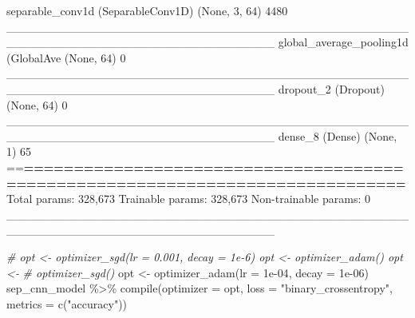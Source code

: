\documentclass[
]{article}
\newenvironment{Shaded}{}{}
\newcommand{\AttributeTok}[1]{\textcolor[rgb]{0.49,0.56,0.16}{#1}}
\newcommand{\CommentTok}[1]{\textcolor[rgb]{0.38,0.63,0.69}{\textit{#1}}}
\newcommand{\DecValTok}[1]{\textcolor[rgb]{0.25,0.63,0.44}{#1}}
\newcommand{\ErrorTok}[1]{\textcolor[rgb]{1.00,0.00,0.00}{\textbf{#1}}}
\newcommand{\FloatTok}[1]{\textcolor[rgb]{0.25,0.63,0.44}{#1}}
\newcommand{\FunctionTok}[1]{\textcolor[rgb]{0.02,0.16,0.49}{#1}}
\newcommand{\NormalTok}[1]{#1}
\newcommand{\OtherTok}[1]{\textcolor[rgb]{0.00,0.44,0.13}{#1}}
\newcommand{\SpecialCharTok}[1]{\textcolor[rgb]{0.25,0.44,0.63}{#1}}
\newcommand{\StringTok}[1]{\textcolor[rgb]{0.25,0.44,0.63}{#1}}
\begin{document}
\begin{Shaded}
\begin{Highlighting}[]
\FunctionTok{separable\_conv1d}\NormalTok{ (SeparableConv1D)  (None, }\DecValTok{3}\NormalTok{, }\DecValTok{64}\NormalTok{)                   }\DecValTok{4480}        
\NormalTok{\_\_\_\_\_\_\_\_\_\_\_\_\_\_\_\_\_\_\_\_\_\_\_\_\_\_\_\_\_\_\_\_\_\_\_\_\_\_\_\_\_\_\_\_\_\_\_\_\_\_\_\_\_\_\_\_\_\_\_\_\_\_\_\_\_\_\_\_\_\_\_\_\_\_\_\_\_\_\_\_}
\FunctionTok{global\_average\_pooling1d}\NormalTok{ (}\FunctionTok{GlobalAve}\NormalTok{ (None, }\DecValTok{64}\NormalTok{)                      }\DecValTok{0}           
\NormalTok{\_\_\_\_\_\_\_\_\_\_\_\_\_\_\_\_\_\_\_\_\_\_\_\_\_\_\_\_\_\_\_\_\_\_\_\_\_\_\_\_\_\_\_\_\_\_\_\_\_\_\_\_\_\_\_\_\_\_\_\_\_\_\_\_\_\_\_\_\_\_\_\_\_\_\_\_\_\_\_\_}
\FunctionTok{dropout\_2}\NormalTok{ (Dropout)                 (None, }\DecValTok{64}\NormalTok{)                      }\DecValTok{0}           
\NormalTok{\_\_\_\_\_\_\_\_\_\_\_\_\_\_\_\_\_\_\_\_\_\_\_\_\_\_\_\_\_\_\_\_\_\_\_\_\_\_\_\_\_\_\_\_\_\_\_\_\_\_\_\_\_\_\_\_\_\_\_\_\_\_\_\_\_\_\_\_\_\_\_\_\_\_\_\_\_\_\_\_}
\FunctionTok{dense\_8}\NormalTok{ (Dense)                     (None, }\DecValTok{1}\NormalTok{)                       }\DecValTok{65}          
\SpecialCharTok{==}\ErrorTok{==============================================================================}
\NormalTok{Total params}\SpecialCharTok{:} \DecValTok{328}\NormalTok{,}\DecValTok{673}
\NormalTok{Trainable params}\SpecialCharTok{:} \DecValTok{328}\NormalTok{,}\DecValTok{673}
\NormalTok{Non}\SpecialCharTok{{-}}\NormalTok{trainable params}\SpecialCharTok{:} \DecValTok{0}
\NormalTok{\_\_\_\_\_\_\_\_\_\_\_\_\_\_\_\_\_\_\_\_\_\_\_\_\_\_\_\_\_\_\_\_\_\_\_\_\_\_\_\_\_\_\_\_\_\_\_\_\_\_\_\_\_\_\_\_\_\_\_\_\_\_\_\_\_\_\_\_\_\_\_\_\_\_\_\_\_\_\_\_}
\end{Highlighting}
\end{Shaded}

\begin{Shaded}
\begin{Highlighting}[]
\CommentTok{\# opt \textless{}{-} optimizer\_sgd(lr = 0.001, decay = 1e{-}6) opt \textless{}{-} optimizer\_adam() opt \textless{}{-}}
\CommentTok{\# optimizer\_sgd()}
\NormalTok{opt }\OtherTok{\textless{}{-}} \FunctionTok{optimizer\_adam}\NormalTok{(}\AttributeTok{lr =} \FloatTok{1e{-}04}\NormalTok{, }\AttributeTok{decay =} \FloatTok{1e{-}06}\NormalTok{)}
\NormalTok{sep\_cnn\_model }\SpecialCharTok{\%\textgreater{}\%}
    \FunctionTok{compile}\NormalTok{(}\AttributeTok{optimizer =}\NormalTok{ opt, }\AttributeTok{loss =} \StringTok{"binary\_crossentropy"}\NormalTok{, }\AttributeTok{metrics =} \FunctionTok{c}\NormalTok{(}\StringTok{"accuracy"}\NormalTok{))}
\end{Highlighting}
\end{Shaded}
\end{document}
